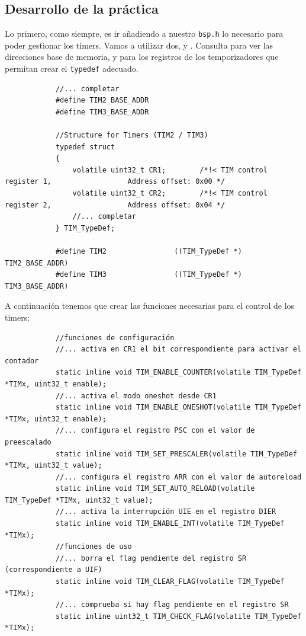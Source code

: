 \documentclass[../main.tex]{subfiles}
\begin{document}
    \subsection{Desarrollo de la práctica}

        Lo primero, como siempre, es ir añadiendo a nuestro \texttt{bsp.h} lo necesario para poder gestionar los timers. Vamos a utilizar dos,  y . Consulta \REFMAN[1.6] para ver las direcciones base de memoria, y \REFMAN[19.4] para los registros de los temporizadores que permitan crear el \lstinline|typedef| adecuado.

        \begin{lstlisting}
            //... completar
            #define TIM2_BASE_ADDR   
            #define TIM3_BASE_ADDR  

            //Structure for Timers (TIM2 / TIM3)
            typedef struct
            {
                volatile uint32_t CR1;        /*!< TIM control register 1,                  Address offset: 0x00 */
                volatile uint32_t CR2;        /*!< TIM control register 2,                  Address offset: 0x04 */
                //... completar
            } TIM_TypeDef;

            #define TIM2                ((TIM_TypeDef *) TIM2_BASE_ADDR)
            #define TIM3                ((TIM_TypeDef *) TIM3_BASE_ADDR)
        \end{lstlisting}

        A continuación tenemos que crear las funciones necesarias para el control de los timers:

        \begin{lstlisting}
            //funciones de configuración
            //... activa en CR1 el bit correspondiente para activar el contador
            static inline void TIM_ENABLE_COUNTER(volatile TIM_TypeDef *TIMx, uint32_t enable);
            //... activa el modo oneshot desde CR1
            static inline void TIM_ENABLE_ONESHOT(volatile TIM_TypeDef *TIMx, uint32_t enable);
            //... configura el registro PSC con el valor de preescalado
            static inline void TIM_SET_PRESCALER(volatile TIM_TypeDef *TIMx, uint32_t value);
            //... configura el registro ARR con el valor de autoreload
            static inline void TIM_SET_AUTO_RELOAD(volatile TIM_TypeDef *TIMx, uint32_t value);
            //... activa la interrupción UIE en el registro DIER
            static inline void TIM_ENABLE_INT(volatile TIM_TypeDef *TIMx);
            //funciones de uso
            //... borra el flag pendiente del registro SR (correspondiente a UIF)
            static inline void TIM_CLEAR_FLAG(volatile TIM_TypeDef *TIMx);
            //... comprueba si hay flag pendiente en el registro SR
            static inline uint32_t TIM_CHECK_FLAG(volatile TIM_TypeDef *TIMx);
        \end{lstlisting}
\end{document}
